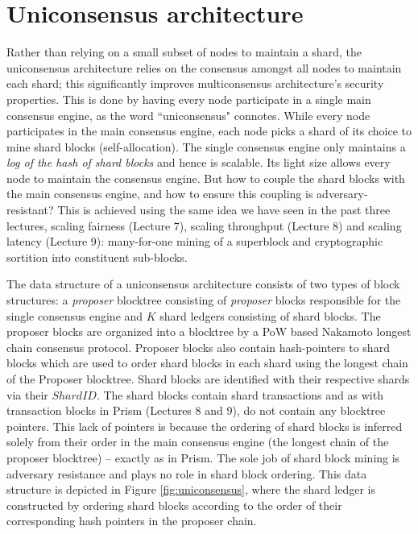 \documentclass{article}
\begin{document}
\section{Uniconsensus architecture}
Rather than relying on a small subset of nodes to maintain a shard, the uniconsensus architecture relies on the consensus amongst all nodes to maintain each shard; this significantly improves multiconsensus architecture's security properties. This is done by having every node participate in a single main consensus engine, as the word ``uniconsensus" connotes. While every node participates in the main consensus engine, each node picks a shard of its choice to mine shard blocks (self-allocation). The single consensus engine only maintains a {\em log of the hash of shard blocks} and hence is scalable. Its light size allows every node to maintain the consensus engine. But how to couple the shard blocks with the main consensus engine, and how to ensure this coupling is adversary-resistant? This is achieved using the same idea we have seen in the past three lectures, scaling fairness (Lecture 7), scaling throughput (Lecture 8) and scaling latency (Lecture 9): many-for-one mining of a superblock and cryptographic sortition into constituent sub-blocks. 

The data structure of a uniconsensus architecture consists of two types of block structures: a {\em proposer} blocktree consisting of {\em proposer} blocks responsible for the single consensus engine and $K$ shard ledgers consisting of shard blocks. The proposer blocks are organized into a blocktree by a PoW based Nakamoto longest chain consensus protocol. Proposer blocks also contain hash-pointers to shard blocks which are used to order shard blocks in each shard using the longest chain of the Proposer blocktree. Shard blocks  are identified with their respective shards via their $ShardID$. The shard blocks contain shard transactions and as with transaction blocks in {\sf Prism} (Lectures 8 and 9), do not contain any blocktree pointers. This lack of pointers is because the ordering of shard blocks is inferred solely from their order in the main consensus engine (the longest chain of the proposer blocktree) -- exactly as in {\sf Prism}. The sole job of shard block mining is adversary resistance and plays no role in shard block ordering. This data structure is depicted in Figure \ref{fig:uniconsensus}, where the shard ledger is constructed by ordering shard blocks according to the order of their corresponding hash pointers in the proposer chain.
\end{document}
